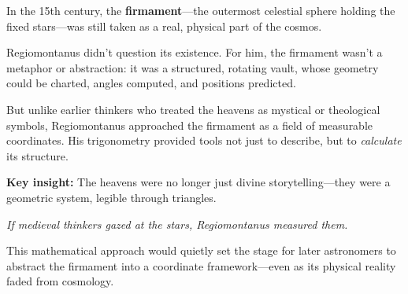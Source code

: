 \begin{tcolorbox}[colback=gray!5, colframe=black, title=\textbf{Historical Sidebar: Regiomontanus and the Measurable Firmament}, fonttitle=\bfseries, arc=1.5mm, boxrule=0.4pt]

  In the 15th century, the \textbf{firmament}—the outermost celestial sphere holding the fixed stars—was still taken as a real, physical part of the cosmos.
  
  Regiomontanus didn’t question its existence. For him, the firmament wasn’t a metaphor or abstraction: it was a structured, rotating vault, whose geometry could be charted, angles computed, and positions predicted.
  
  But unlike earlier thinkers who treated the heavens as mystical or theological symbols, Regiomontanus approached the firmament as a field of measurable coordinates. His trigonometry provided tools not just to describe, but to \emph{calculate} its structure.
  
  \medskip
  
  \textbf{Key insight:} The heavens were no longer just divine storytelling—they were a geometric system, legible through triangles.
  
  \begin{center}
  \emph{If medieval thinkers gazed at the stars, Regiomontanus measured them.}
  \end{center}
  
  This mathematical approach would quietly set the stage for later astronomers to abstract the firmament into a coordinate framework—even as its physical reality faded from cosmology.
  
  \end{tcolorbox}

